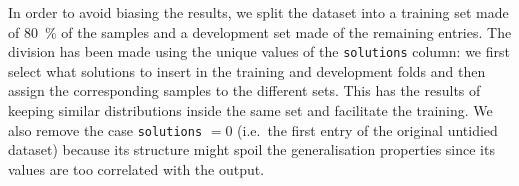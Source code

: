 In order to avoid biasing the results, we split the dataset into a training set made of \SI{80}{\percent} of the samples and a development set made of the remaining entries.
The division has been made using the unique values of the \texttt{solutions} column: we first select what solutions to insert in the training and development folds and then assign the corresponding samples to the different sets.
This has the results of keeping similar distributions inside the same set and facilitate the training.\footnotemark{}
We also remove the case \texttt{solutions} $= 0$ (i.e.\ the first entry of the original untidied dataset) because its structure might spoil the generalisation properties since its values are too correlated with the output.

